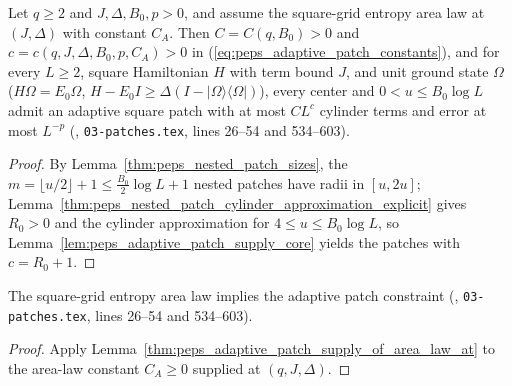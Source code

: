 \begin{lemma}
    \label{thm:peps_adaptive_patch_supply_of_area_law_at}
    \leanok
    Let $q\ge2$ and $J,\Delta,B_0,p>0$, and assume the square-grid entropy area
    law at $(J,\Delta)$ with constant $C_A$. Then $C=C(q,B_0)>0$ and
    $c=c(q,J,\Delta,B_0,p,C_A)>0$ in (\ref{eq:peps_adaptive_patch_constants}),
    and for every $L\ge2$, square Hamiltonian $H$ with term bound $J$, and unit
    ground state $\Omega$ ($H\Omega=E_0\Omega$,
    $H-E_0I\ge\Delta(I-|\Omega\rangle\langle\Omega|)$), every center and
    $0<u\le B_0\log L$ admit an adaptive square patch with at most $CL^c$
    cylinder terms and error at most $L^{-p}$
    (\cite[Proposition~4.1]{OpenAI2026PolynomialPEPS}, \texttt{03-patches.tex},
    lines 26--54 and 534--603).
\end{lemma}

\begin{proof}
    \leanok
    By Lemma~\ref{thm:peps_nested_patch_sizes}, the $m=\lfloor u/2\rfloor+1\le\frac{B_0}{2}\log L+1$
    nested patches have radii in $[u,2u]$;
    Lemma~\ref{thm:peps_nested_patch_cylinder_approximation_explicit} gives
    $R_0>0$ and the cylinder approximation for $4\le u\le B_0\log L$, so
    Lemma~\ref{lem:peps_adaptive_patch_supply_core} yields the patches with
    $c=R_0+1$.
\end{proof}

\begin{lemma}
    \label{thm:peps_adaptive_patch_constraint_of_area_law}
    \leanok
    The square-grid entropy area law implies the adaptive patch constraint
    (\cite[Proposition~4.1]{OpenAI2026PolynomialPEPS}, \texttt{03-patches.tex},
    lines 26--54 and 534--603).
\end{lemma}

\begin{proof}
    \leanok
    Apply Lemma~\ref{thm:peps_adaptive_patch_supply_of_area_law_at} to the
    area-law constant $C_A\ge0$ supplied at $(q,J,\Delta)$.
\end{proof}

